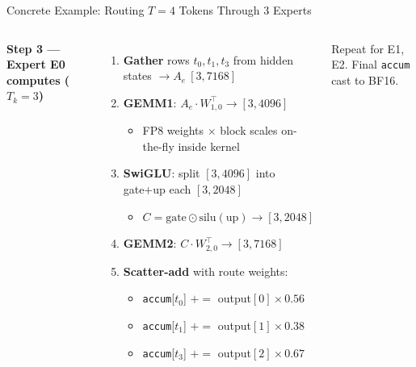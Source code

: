 \begin{frame}{Concrete Example: Routing $T=4$ Tokens Through 3 Experts}
\begin{columns}[T]
\textbf{Step 3 --- Expert E0 computes ($T_k=3$)}
\scriptsize
\begin{enumerate}
  \item \textbf{Gather} rows $t_0, t_1, t_3$ from hidden states $\to A_e\ [3, 7168]$
  \item \textbf{GEMM1}: $A_e \cdot W_{1,0}^\top \to [3, 4096]$
  \begin{itemize}\scriptsize
    \item FP8 weights $\times$ block scales on-the-fly inside kernel
  \end{itemize}
  \item \textbf{SwiGLU}: split $[3,4096]$ into gate+up each $[3,2048]$
  \begin{itemize}\scriptsize
    \item $C = \text{gate} \odot \text{silu}(\text{up}) \to [3, 2048]$
  \end{itemize}
  \item \textbf{GEMM2}: $C \cdot W_{2,0}^\top \to [3, 7168]$
  \item \textbf{Scatter-add} with route weights:
  \begin{itemize}\scriptsize
    \item \texttt{accum}[$t_0$] $+=$ output$[0] \times 0.56$
    \item \texttt{accum}[$t_1$] $+=$ output$[1] \times 0.38$
    \item \texttt{accum}[$t_3$] $+=$ output$[2] \times 0.67$
  \end{itemize}
\end{enumerate}
Repeat for E1, E2. Final \texttt{accum} cast to BF16.
\end{columns}
\end{frame}

